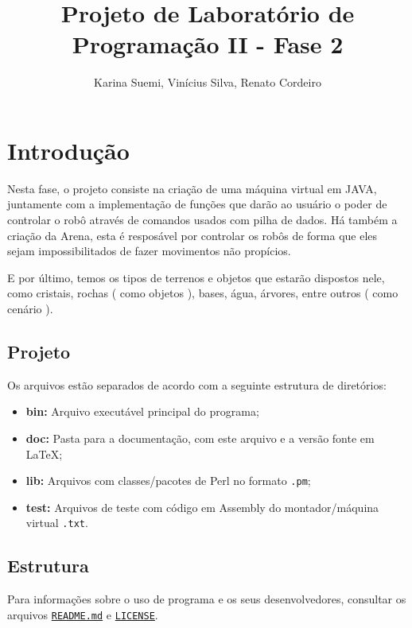 \documentclass[a4paper]{article}
\title  {Projeto de Laboratório de Programação II - Fase 2}
\author {Karina Suemi, Vinícius Silva, Renato Cordeiro}
\date   {}
\begin{document}
\maketitle

\section{Introdução} \label{sec:introdução}

    Nesta fase, o projeto consiste na criação de uma máquina
    virtual em JAVA, juntamente com a implementação de funções
    que darão ao usuário o poder de controlar o robô através 
    de comandos usados com pilha de dados.
    Há também a criação da Arena, esta é resposável por controlar
    os robôs de forma que eles sejam impossibilitados de fazer
    movimentos não propícios. 
    
    E por último, temos os tipos de terrenos e objetos que estarão
    dispostos nele, como cristais, rochas ( como objetos ), bases, 
    água, árvores, entre outros ( como cenário ). 
    
    
    \subsection{Projeto}
    
    Os arquivos estão separados de acordo com a seguinte estrutura de
    diretórios:
    \begin{itemize}
        \item \textbf{bin:}  Arquivo executável principal do programa;
        \item \textbf{doc:}  Pasta para a documentação, com este arquivo 
                             e a versão fonte em \LaTeX;
        \item \textbf{lib:}  Arquivos com classes/pacotes de Perl 
                             no formato \texttt{.pm};
        \item \textbf{test:} Arquivos de teste com código em Assembly
                             do montador/máquina virtual \texttt{.txt}.
    \end{itemize}
    
    \subsection{Estrutura}
      
        Para informações sobre o uso de programa e os seus 
        desenvolvedores, consultar os arquivos \href{run:../README.md}
        {\texttt{README.md}} e \href{run:../LICENSE}{\texttt{LICENSE}}.
        
\end{document}
